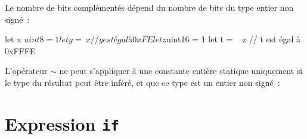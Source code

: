 Le nombre de bits complémentés dépend du nombre de bits du type entier non signé~:
\begin{PLM}
let x $uint8 = 1
let y = ~ x // y est égal à 0xFE
let z $uint16 = 1
let t = ~ z // t est égal à 0xFFFE
\end{PLM}

L'opérateur $\sim$ ne peut s'appliquer à une constante entière statique uniquement si le type du résultat peut être inféré, et que ce type est un entier non signé~:





\section{Expression \texttt{if}}

